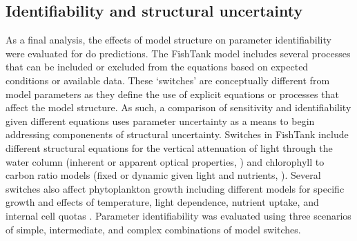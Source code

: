 \documentclass[letterpaper,12pt,oneside]{article}\usepackage[]{graphicx}\usepackage[]{color}
\begin{document}
\subsection{Identifiability and structural uncertainty}

As a final analysis, the effects of model structure on parameter identifiability were evaluated for \ac{do} predictions.  The FishTank model includes several processes that can be included or excluded from the equations based on expected conditions or available data.  These `switches' are conceptually different from model parameters as they define the use of explicit equations or processes that affect the model structure.  As such, a comparison of sensitivity and identifiability given different equations uses parameter uncertainty as a means to begin addressing componenents of structural uncertainty.  Switches in FishTank include different structural equations for the vertical attenuation of light through the water column (inherent or apparent optical properties, \citealt{Penta09,Eldridge10}) and chlorophyll to carbon ratio models (fixed or dynamic given light and nutrients, \citealt{Cloern95}).  Several switches also affect phytoplankton growth including different models for specific growth and effects of temperature, light dependence, nutrient uptake, and internal cell quotas .  Parameter identifiability was evaluated using three scenarios of simple, intermediate, and complex combinations of model switches.  
\end{document}
